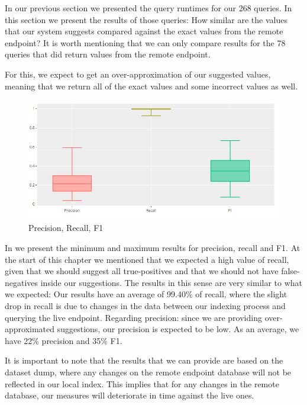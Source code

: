 In our previous section we presented the query runtimes for our 268 queries. In this section we present the results of those queries: How similar are the values that our system suggests compared against the exact values from the remote endpoint? It is worth mentioning that we can only compare  results for the 78 queries that did return values from the remote endpoint. 

For this, we expect to get an over-approximation of our suggested values, meaning that we return all of the exact values and some incorrect values as well. 

\begin{figure}[ht]
    \centering
        \includegraphics[width=\linewidth]{imagenes/resultsCandleStick.png}
        \caption{Precision, Recall, F1}
        \label{fig:resultsCandles}
\end{figure}

In  we present the minimum and maximum results for precision, recall and F1. At the start of this chapter we mentioned that we expected a high value of recall, given that we should suggest all true-positives and that we should not have false-negatives inside our suggestions. The results in this sense are very similar to what we expected: Our results have an average of 99.40\% of recall, where the slight drop in recall is due to changes in the data between our indexing process and querying the live endpoint. Regarding precision: since we are providing over-approximated suggestions, our precision is expected to be low. As an average, we have 22\% precision and 35\% F1.

It is important to note that the results that we can provide are based on the dataset dump, where any changes on the remote endpoint database will not be reflected in our local index. This implies that for any changes in the remote database, our measures will deteriorate in time against the live ones.

